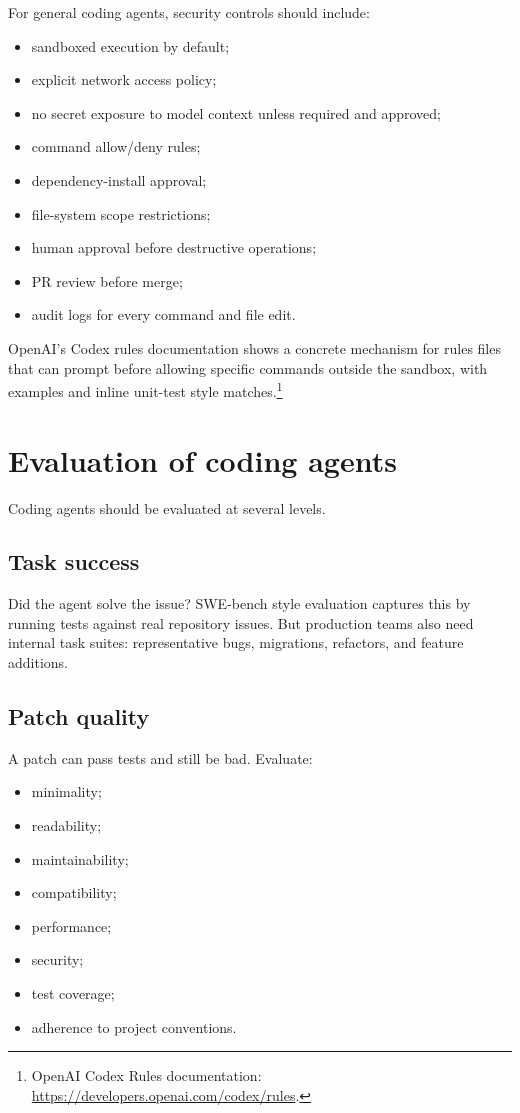 For general coding agents, security controls should include:

\begin{itemize}[leftmargin=*]
  \item sandboxed execution by default;
  \item explicit network access policy;
  \item no secret exposure to model context unless required and approved;
  \item command allow/deny rules;
  \item dependency-install approval;
  \item file-system scope restrictions;
  \item human approval before destructive operations;
  \item PR review before merge;
  \item audit logs for every command and file edit.
\end{itemize}

OpenAI's Codex rules documentation shows a concrete mechanism for rules files that can prompt before allowing specific commands outside the sandbox, with examples and inline unit-test style matches.\footnote{OpenAI Codex Rules documentation: \url{https://developers.openai.com/codex/rules}.}

\section{Evaluation of coding agents}

Coding agents should be evaluated at several levels.

\subsection{Task success}

Did the agent solve the issue? SWE-bench style evaluation captures this by running tests against real repository issues. But production teams also need internal task suites: representative bugs, migrations, refactors, and feature additions.

\subsection{Patch quality}

A patch can pass tests and still be bad. Evaluate:

\begin{itemize}[leftmargin=*]
  \item minimality;
  \item readability;
  \item maintainability;
  \item compatibility;
  \item performance;
  \item security;
  \item test coverage;
  \item adherence to project conventions.
\end{itemize}

